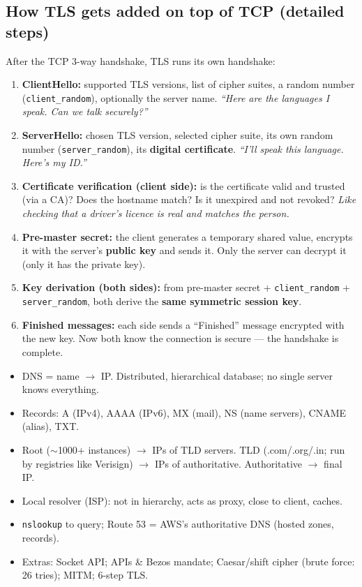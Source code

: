 \subsection{How TLS gets added on top of TCP (detailed steps)}
After the TCP 3-way handshake, TLS runs its own handshake:
\begin{enumerate}
  \item \textbf{ClientHello:} supported TLS versions, list of cipher suites, a random number (\texttt{client\_random}), optionally the server name. \emph{``Here are the languages I speak. Can we talk securely?''}
  \item \textbf{ServerHello:} chosen TLS version, selected cipher suite, its own random number (\texttt{server\_random}), its \textbf{digital certificate}. \emph{``I'll speak this language. Here's my ID.''}
  \item \textbf{Certificate verification (client side):} is the certificate valid and trusted (via a CA)? Does the hostname match? Is it unexpired and not revoked? \emph{Like checking that a driver's licence is real and matches the person.}
  \item \textbf{Pre-master secret:} the client generates a temporary shared value, encrypts it with the server's \textbf{public key} and sends it. Only the server can decrypt it (only it has the private key).
  \item \textbf{Key derivation (both sides):} from pre-master secret + \texttt{client\_random} + \texttt{server\_random}, both derive the \textbf{same symmetric session key}.
  \item \textbf{Finished messages:} each side sends a ``Finished'' message encrypted with the new key. Now both know the connection is secure --- the handshake is complete.
\end{enumerate}

\begin{recap}
\begin{itemize}
  \item DNS = name $\to$ IP. Distributed, hierarchical database; no single server knows everything.
  \item Records: A (IPv4), AAAA (IPv6), MX (mail), NS (name servers), CNAME (alias), TXT.
  \item Root ($\sim$1000+ instances) $\to$ IPs of TLD servers. TLD (.com/.org/.in; run by registries like Verisign) $\to$ IPs of authoritative. Authoritative $\to$ final IP.
  \item Local resolver (ISP): not in hierarchy, acts as proxy, close to client, caches.
  \item \texttt{nslookup} to query; Route 53 = AWS's authoritative DNS (hosted zones, records).
  \item Extras: Socket API; APIs \& Bezos mandate; Caesar/shift cipher (brute force: 26 tries); MITM; 6-step TLS.
\end{itemize}
\end{recap}
